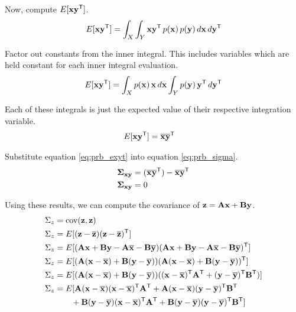 Now, compute $E[\mathbf{x}\mathbf{y}^\mathsf{T}]$.
\begin{equation*}
  E[\mathbf{x}\mathbf{y}^\mathsf{T}] = \int_X \int_Y \mathbf{x}\mathbf{y}^\mathsf{T} \,p(\mathbf{x})
    \,p(\mathbf{y}) \,d\mathbf{x} \,d\mathbf{y}^\mathsf{T}
\end{equation*}

Factor out constants from the inner integral. This includes variables which are
held constant for each inner integral evaluation.
\begin{equation*}
  E[\mathbf{x}\mathbf{y}^\mathsf{T}] = \int_X p(\mathbf{x}) \,\mathbf{x} \,d\mathbf{x}
    \int_Y p(\mathbf{y}) \,\mathbf{y}^\mathsf{T} \,d\mathbf{y}^\mathsf{T}
\end{equation*}

Each of these integrals is just the expected value of their respective
integration variable.
\begin{align}
  E[\mathbf{x}\mathbf{y}^\mathsf{T}] &= \overline{\mathbf{x}}\overline{\mathbf{y}}^\mathsf{T} \label{eq:prb_exyt}
\end{align}

Substitute equation \eqref{eq:prb_exyt} into equation \eqref{eq:prb_sigma}.
\begin{align*}
  \mathbf{\Sigma}_{\mathbf{x}\mathbf{y}} &= (\overline{\mathbf{x}}\overline{\mathbf{y}}^\mathsf{T}) -
    \overline{\mathbf{x}}\overline{\mathbf{y}}^\mathsf{T} \\
  \mathbf{\Sigma}_{\mathbf{x}\mathbf{y}} &= 0
\end{align*}

Using these results, we can compute the covariance of
$\mathbf{z} = \mathbf{A}\mathbf{x} + \mathbf{B}\mathbf{y}$.
\begin{align*}
  \Sigma_z &= \operatorname{cov}(\mathbf{z}, \mathbf{z}) \\
  \Sigma_z &= E[(\mathbf{z} - \overline{\mathbf{z}})(\mathbf{z} - \overline{\mathbf{z}})^\mathsf{T}] \\
  \Sigma_z &= E[(\mathbf{A}\mathbf{x} + \mathbf{B}\mathbf{y} - \mathbf{A}\overline{\mathbf{x}} -
    \mathbf{B}\overline{\mathbf{y}})(\mathbf{A}\mathbf{x} + \mathbf{B}\mathbf{y} -
    \mathbf{A}\overline{\mathbf{x}} - \mathbf{B}\overline{\mathbf{y}})^\mathsf{T}] \\
  \Sigma_z &= E[(\mathbf{A}(\mathbf{x} - \overline{\mathbf{x}}) +
    \mathbf{B}(\mathbf{y} - \overline{\mathbf{y}}))
    (\mathbf{A}(\mathbf{x} - \overline{\mathbf{x}}) +
     \mathbf{B}(\mathbf{y} - \overline{\mathbf{y}}))^\mathsf{T}] \\
  \Sigma_z &= E[(\mathbf{A}(\mathbf{x} - \overline{\mathbf{x}}) +
    \mathbf{B}(\mathbf{y} - \overline{\mathbf{y}}))
    ((\mathbf{x} - \overline{\mathbf{x}})^\mathsf{T}\mathbf{A}^\mathsf{T} +
     (\mathbf{y} - \overline{\mathbf{y}})^\mathsf{T}\mathbf{B}^\mathsf{T})] \\
  \Sigma_z &= E[
    \mathbf{A}(\mathbf{x} - \overline{\mathbf{x}})(\mathbf{x} - \overline{\mathbf{x}})^\mathsf{T}\mathbf{A}^\mathsf{T} +
    \mathbf{A}(\mathbf{x} - \overline{\mathbf{x}})(\mathbf{y} - \overline{\mathbf{y}})^\mathsf{T}\mathbf{B}^\mathsf{T} \\
    &\qquad + \mathbf{B}(\mathbf{y} - \overline{\mathbf{y}})(\mathbf{x} - \overline{\mathbf{x}})^\mathsf{T}\mathbf{A}^\mathsf{T} +
    \mathbf{B}(\mathbf{y} - \overline{\mathbf{y}})(\mathbf{y} - \overline{\mathbf{y}})^\mathsf{T}\mathbf{B}^\mathsf{T}]
\end{align*}

